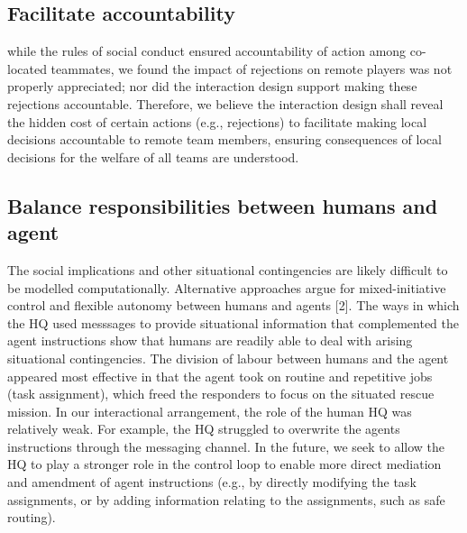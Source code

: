\subsection{Facilitate accountability}
while the rules of social conduct ensured accountability of action among co-located teammates, we found the impact of rejections on remote players was not properly appreciated; nor did the interaction design support making these rejections accountable. Therefore, we believe the interaction design shall reveal the hidden cost of certain actions (e.g., rejections) to facilitate making local decisions accountable to remote team members, ensuring consequences of local decisions for the welfare of all teams are understood. 

\subsection{Balance responsibilities between humans and agent}\label{sec:balanceResponsibility}
 The social implications and other situational contingencies are likely difficult to be modelled computationally. Alternative approaches argue for mixed-initiative  control and flexible autonomy between humans and agents [2]. The ways in which the HQ used messsages to provide situational information that complemented the agent instructions show that humans are readily able to deal with arising situational contingencies. The division of labour between humans and the agent appeared most effective in that the agent took on routine and repetitive jobs (task assignment), which freed the responders to focus on the situated rescue mission. In our interactional arrangement, the role of the human HQ was relatively weak. For example, the HQ struggled to overwrite the agents instructions through the messaging channel. In the future, we seek to allow the HQ to play a stronger role in the control loop to enable more direct mediation and amendment of agent instructions (e.g., by directly modifying the task assignments, or by adding information relating to the assignments, such as safe routing).
 

